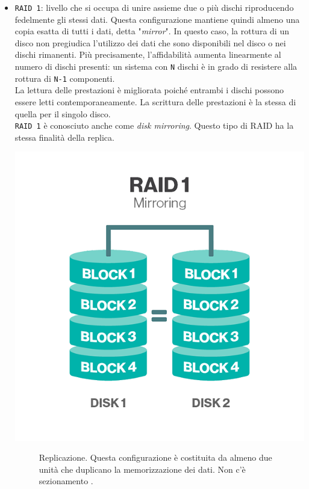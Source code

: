 \begin{itemize}
\item 
\verb"RAID 1": livello che si occupa di unire assieme due o pi\`{u} dischi riproducendo fedelmente gli stessi dati. Questa configurazione mantiene quindi almeno una copia esatta di tutti i dati, detta "\textit{mirror}". In questo caso, la rottura di un disco non pregiudica l'utilizzo dei dati che sono disponibili nel disco o nei dischi rimanenti. Pi\`{u} precisamente, l'affidabilit\`{a} aumenta linearmente al numero di dischi presenti: un sistema con \verb"N" dischi \`{e} in grado di resistere alla rottura di \verb"N-1" componenti.\\ La lettura delle prestazioni \`{e} migliorata poich\'{e} entrambi i dischi possono essere letti contemporaneamente. La scrittura delle prestazioni \`{e} la stessa di quella per il singolo disco\cite{etichetta9}. \\
\verb"RAID 1" \`{e} conosciuto anche come \textit{disk mirroring}. Questo tipo di RAID ha la stessa finalit\`{a} della replica.\\


\begin{center}
\includegraphics[scale=0.40]{img/raid11.png}
\end{center}

\begin{figure}[htbp]
\caption{Replicazione. Questa configurazione \`{e} costituita da almeno due unit\`{a} che duplicano la memorizzazione dei dati. Non c'\`{e} sezionamento \cite{etichetta9}.}
\label{fig:raid11}
\end{figure}


\end{itemize}
